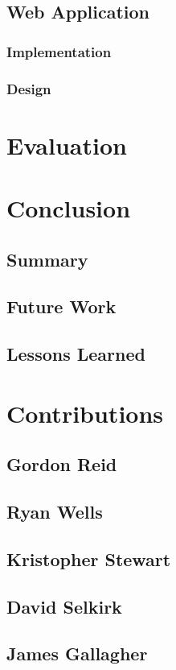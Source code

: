 \documentclass{l3proj}
\begin{document}
\section{Web Application}

\subsection{Implementation}

\subsection{Design}
\chapter{Evaluation}

\chapter{Conclusion}

\section{Summary}

\section{Future Work}

\section{Lessons Learned}
\chapter{Contributions}

\section{Gordon Reid}

\section{Ryan Wells}

\section{Kristopher Stewart}

\section{David Selkirk}

\section{James Gallagher}



\end{document}
